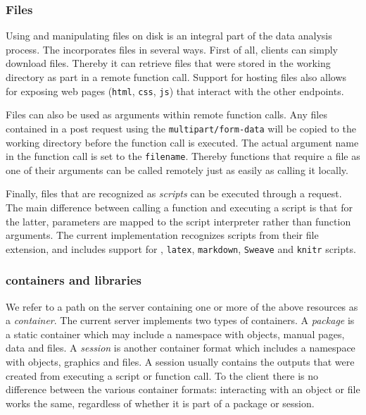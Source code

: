 \subsubsection{Files}

Using and manipulating files on disk is an integral part of the data analysis process. The \API incorporates files in several ways. First of all, clients can simply download files. Thereby it can retrieve files that were stored in the working directory as part in a remote function call. Support for hosting files also allows for exposing web pages (\texttt{html}, \texttt{css}, \texttt{js}) that interact with the other \API endpoints. 

Files can also be used as arguments within remote function calls. Any files contained in a post request using the \texttt{multipart/form-data} will be copied to the working directory before the function call is executed. The actual argument name in the function call is set to the \texttt{filename}. Thereby functions that require a file as one of their arguments can be called remotely just as easily as calling it locally. 

Finally, files that are recognized as \emph{scripts} can be executed through a \POST request. The main difference between calling a function and executing a script is that for the latter, \HTTP parameters are mapped to the script interpreter rather than function arguments. The current \OpenCPU implementation recognizes scripts from their file extension, and includes support for \R, \texttt{latex}, \texttt{markdown}, \texttt{Sweave} and \texttt{knitr} scripts. 


\subsubsection{containers and libraries}
 
We refer to a path on the server containing one or more of the above resources as a \emph{container}. The current \OpenCPU server implements two types of containers. A \emph{package} is a static container which may include a namespace with objects, manual pages, data and files. A \emph{session} is another container format which includes a namespace with objects, graphics and files. A session usually contains the outputs that were created from executing a script or function call. To the client there is no difference between the various container formats: interacting with an object or file works the same, regardless of whether it is part of a package or session.

